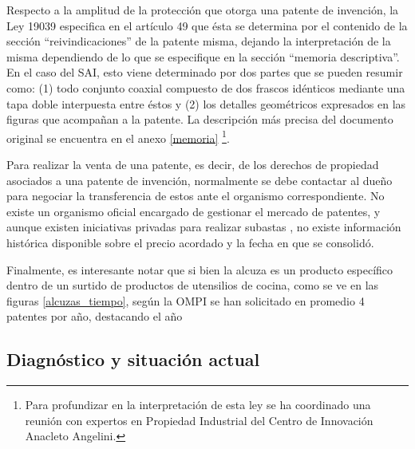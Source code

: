 Respecto a la amplitud de la protección que otorga una patente de invención, la Ley 19039 especifica en el artículo 49 que ésta se determina por el contenido de la sección “reivindicaciones” de la patente misma, dejando la interpretación de la misma dependiendo de lo que se especifique en la sección “memoria descriptiva”. En el caso del SAI,  esto viene determinado por dos partes que se pueden resumir como: (1) todo conjunto coaxial compuesto de dos frascos idénticos mediante una tapa doble interpuesta entre éstos y (2) los detalles geométricos  expresados en las figuras que acompañan a la patente. La descripción más precisa del documento original se encuentra en el anexo \ref{memoria}
\footnote{Para profundizar en la interpretación de esta ley se ha coordinado una reunión con expertos en Propiedad Industrial del Centro de Innovación Anacleto Angelini.}.


Para realizar la venta de una patente, es decir, de los derechos de propiedad asociados a una patente de invención, normalmente se debe contactar al dueño para negociar la transferencia de estos ante el organismo correspondiente. No existe un organismo oficial encargado de gestionar el mercado de patentes, y aunque existen iniciativas privadas para realizar subastas , no existe información histórica disponible sobre el precio acordado y la fecha en que se consolidó.


Finalmente, es interesante notar que si bien la alcuza es un producto específico dentro de un surtido de productos de utensilios de cocina, como se ve en las figuras \ref{alcuzas_tiempo},
según la OMPI se han solicitado en promedio 4 patentes por año, destacando el año


\subsection{Diagnóstico y situación actual}

% 
%
% 
